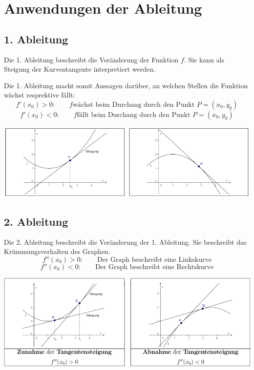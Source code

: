 \section{Anwendungen der Ableitung}
\subsection{1. Ableitung}
Die 1. Ableitung beschreibt die Veränderung der Funktion $f$. Sie kann als Steigung der Kurventangente interpretiert werden.

Die 1. Ableitung macht somit Aussagen darüber, an welchen Stellen die Funktion wächst resprektive fällt:
\[
    f'(x_0) > 0: \hspace{2em} f \text{wächst beim Durchang durch den Punkt } P = (x_0,y_0)
\]
\[
    f'(x_0) < 0: \hspace{2em} f \text{fällt beim Durchang durch den Punkt } P = (x_0,y_0)
\]

\begin{center}
    \includegraphics[width=1\linewidth]{images/ersteabl.png}
\end{center}

\subsection{2. Ableitung}
Die 2. Ableitung beschreibt die Veränderung der 1. Ableitung. Sie beschreibt das Krümmungsverhalten des Graphen.
\[
    f''(x_0) > 0: \hspace{2em} \text{Der Graph beschreibt eine Linkskurve}
\]
\[
    f''(x_0) < 0: \hspace{2em} \text{Der Graph beschreibt eine Rechtskurve}
\]
\begin{center}
    \includegraphics[width=1\linewidth]{images/zweiteabl.png}
\end{center}

